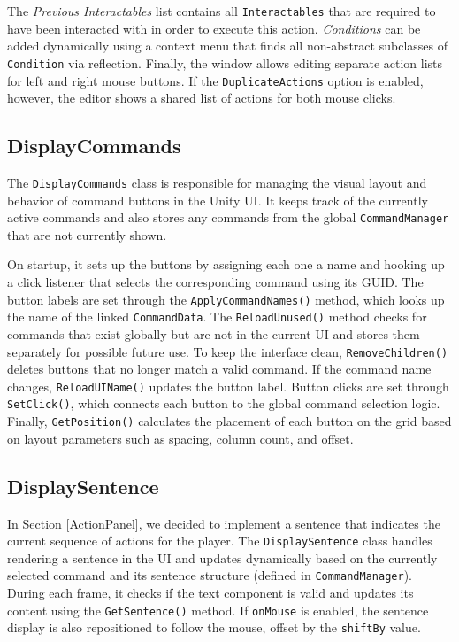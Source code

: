The \textit{Previous Interactables} list contains all \verb|Interactables| that are required to have been interacted with in order to execute this action. \textit{Conditions} can be added dynamically using a context menu that finds all non-abstract subclasses of \verb|Condition| via reflection. Finally, the window allows editing separate action lists for left and right mouse buttons. If the \verb|DuplicateActions| option is enabled, however, the editor shows a shared list of actions for both mouse clicks. 

\subsection{DisplayCommands}
The \verb|DisplayCommands| class is responsible for managing the visual layout and behavior of command buttons in the Unity UI. It keeps track of the currently active commands and also stores any commands from the global \verb|CommandManager| that are not currently shown. 

On startup, it sets up the buttons by assigning each one a name and hooking up a click listener that selects the corresponding command using its GUID. The button labels are set through the \verb|ApplyCommandNames()| method, which looks up the name of the linked \verb|CommandData|. The \verb|ReloadUnused()| method checks for commands that exist globally but are not in the current UI and stores them separately for possible future use. To keep the interface clean, \verb|RemoveChildren()| deletes buttons that no longer match a valid command. If the command name changes, \verb|ReloadUIName()| updates the button label. Button clicks are set through \verb|SetClick()|, which connects each button to the global command selection logic. Finally, \verb|GetPosition()| calculates the placement of each button on the grid based on layout parameters such as spacing, column count, and offset.

 \subsection{DisplaySentence}
In Section \ref{ActionPanel}, we decided to implement a sentence that indicates the current sequence of actions for the player. The \verb|DisplaySentence| class handles rendering a sentence in the UI and updates dynamically based on the currently selected command and its sentence structure (defined in \verb|CommandManager|). During each frame, it checks if the text component is valid and updates its content using the \verb|GetSentence()| method. If \verb|onMouse| is enabled, the sentence display is also repositioned to follow the mouse, offset by the \verb|shiftBy| value.

